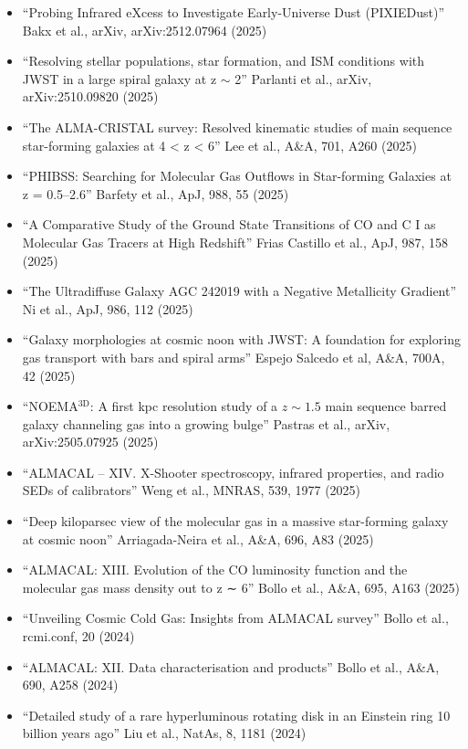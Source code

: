 \documentclass[A4,11pt]{article}
\newenvironment{paperlist}
{ \begin{itemize}[leftmargin=0.8cm, label={$\bullet$}]
    \setlength{\itemsep}{1pt}
    \setlength{\parskip}{1pt}
    \setlength{\parsep}{1pt}     }
{ \end{itemize}                  }
\begin{document}
\begin{paperlist}

  \item ``Probing Infrared eXcess to Investigate Early-Universe Dust (PIXIEDust)'' Bakx et al., arXiv, arXiv:2512.07964 (2025)
\item ``Resolving stellar populations, star formation, and ISM conditions with JWST in a large spiral galaxy at z $\sim$ 2'' Parlanti et al., arXiv, arXiv:2510.09820 (2025)
\item ``The ALMA-CRISTAL survey: Resolved kinematic studies of main sequence star-forming galaxies at 4 < z < 6'' Lee et al., A\&A, 701, A260 (2025)
\item ``PHIBSS: Searching for Molecular Gas Outflows in Star-forming Galaxies at z = 0.5–2.6'' Barfety et al., ApJ, 988, 55 (2025)
\item ``A Comparative Study of the Ground State Transitions of CO and C I as Molecular Gas Tracers at High Redshift'' Frias Castillo et al., ApJ, 987, 158 (2025)
\item ``The Ultradiffuse Galaxy AGC 242019 with a Negative Metallicity Gradient'' Ni et al., ApJ, 986, 112 (2025)
\item ``Galaxy morphologies at cosmic noon with JWST: A foundation for exploring gas transport with bars and spiral arms'' Espejo Salcedo et al, A\&A, 700A, 42 (2025)
\item ``NOEMA$^\textrm{3D}$: A first kpc resolution study of a $z\sim1.5$ main sequence barred galaxy channeling gas into a growing bulge'' Pastras et al., arXiv, arXiv:2505.07925 (2025)
\item ``ALMACAL – XIV. X-Shooter spectroscopy, infrared properties, and radio SEDs of calibrators'' Weng et al., MNRAS, 539, 1977 (2025)
\item ``Deep kiloparsec view of the molecular gas in a massive star-forming galaxy at cosmic noon'' Arriagada-Neira et al., A\&A, 696, A83 (2025)
\item ``ALMACAL: XIII. Evolution of the CO luminosity function and the molecular gas mass density out to z ∼ 6'' Bollo et al., A\&A, 695, A163 (2025)
\item ``Unveiling Cosmic Cold Gas: Insights from ALMACAL survey'' Bollo et al., rcmi.conf, 20 (2024)
\item ``ALMACAL: XII. Data characterisation and products'' Bollo et al., A\&A, 690, A258 (2024)
\item ``Detailed study of a rare hyperluminous rotating disk in an Einstein ring 10 billion years ago'' Liu et al., NatAs, 8, 1181 (2024)


\end{paperlist}
\end{document}

